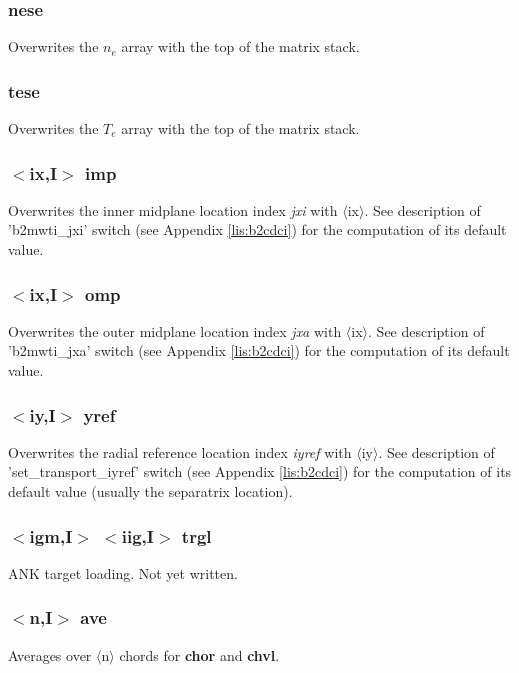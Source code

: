 \documentclass[a4paper,10pt]{report}
\begin{document}
\subsubsection{nese}\label{sec:nese}
Overwrites the $n_e$ array with the top of the matrix stack.

\subsubsection{tese}\label{sec:tese}
Overwrites the $T_e$ array with the top of the matrix stack.

\subsubsection{$<$ix,{\bf I}$>$ imp}\label{sec:imp}
Overwrites the inner midplane location index {\em jxi} with $\langle$ix$\rangle$.
See description of 'b2mwti\_jxi' switch (see Appendix \ref{lis:b2cdci}) for the
computation of its default value.

\subsubsection{$<$ix,{\bf I}$>$ omp}\label{sec:omp}
Overwrites the outer midplane location index {\em jxa} with $\langle$ix$\rangle$.
See description of 'b2mwti\_jxa' switch (see Appendix \ref{lis:b2cdci}) for the
computation of its default value.

\subsubsection{$<$iy,{\bf I}$>$ yref}\label{sec:yref}
Overwrites the radial reference location index {\em iyref} with $\langle$iy$\rangle$.
See description of 'set\_transport\_iyref' switch (see Appendix \ref{lis:b2cdci})
for the computation of its default value (usually the separatrix location).

\subsubsection{$<$igm,{\bf I}$>$ $<$iig,{\bf I}$>$ trgl}\label{sec:trgl}
ANK target loading. Not yet written.

\subsubsection{$<$n,{\bf I}$>$ ave}\label{sec:ave}
Averages over $\langle$n$\rangle$ chords for {\bf chor} and {\bf chvl}.
\end{document}
